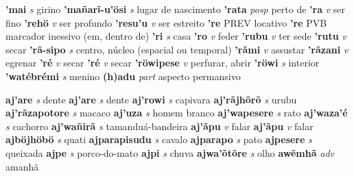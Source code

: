 
\textbf{'mai} \textit{s} {girino}
\textbf{'mañarĩ-u'ösi} \textit{s} {lugar de nascimento}
\textbf{'rata} \textit{posp} {perto de}
\textbf{'ra} \textit{v} {ser fino}
\textbf{'rehö} \textit{v} {ser profundo}
\textbf{'resu'u} \textit{v} {ser estreito}
\textbf{'re} {PREV} {locativo}
\textbf{'re} {PVB} {marcador inessivo (em, dentro de)}
\textbf{'ri} \textit{s} {casa}
\textbf{'ro} \textit{v} {feder}
\textbf{'rubu} \textit{v} {ter sede}
\textbf{'rutu} \textit{v} {secar}
\textbf{'rã-sipo} \textit{s} {centro, núcleo (espacial ou temporal)}
\textbf{'rãmi} \textit{v} {assustar}
\textbf{'rãzani} \textit{v} {egrenar}
\textbf{'ré} \textit{v} {secar}
\textbf{'ré} \textit{v} {secar}
\textbf{'röwipese} \textit{v} {perfurar, abrir}
\textbf{'röwi} \textit{s} {interior}
\textbf{'watébrémi} \textit{s} {menino}
\textbf{(h)adu} \textit{part} {aspecto permansivo}

\textbf{aj'are} \textit{s} {dente}
\textbf{aj'are} \textit{s} {dente}
\textbf{aj'rowi} \textit{s} {capivara}
\textbf{aj'rãjhõrõ} \textit{s} {urubu}
\textbf{aj'rãzapotore} \textit{s} {macaco}
\textbf{aj'uza} \textit{s} {homem branco}
\textbf{aj'wapesere} \textit{s} {rato}
\textbf{aj'waza'é} \textit{s} {cachorro}
\textbf{aj'wañirã} \textit{s} {tamanduá-bandeira}
\textbf{aj'ãpu} \textit{v} {falar}
\textbf{aj'ãpu} \textit{v} {falar}
\textbf{ajböjhöbö} \textit{s} {quati}
\textbf{ajparapisudu} \textit{s} {cavalo}
\textbf{ajparapo} \textit{s} {pato}
\textbf{ajpesere} \textit{s} {queixada}
\textbf{ajpe} \textit{s} {porco-do-mato}
\textbf{ajpi} \textit{s} {chuva}
\textbf{ajwa'õtõre} \textit{s} {olho}
\textbf{awẽmhã} \textit{adv} {amanhã}


